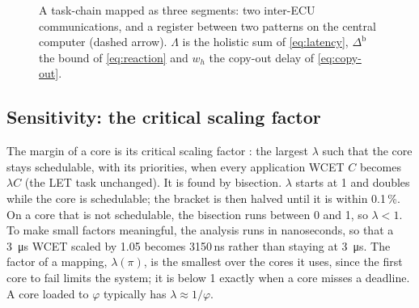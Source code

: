 \begin{figure}[t]
\centering
{}
\caption{A task-chain mapped as three segments: two inter-ECU
communications, and a register between two patterns on the central
computer (dashed arrow). $\Lambda$ is the holistic sum of
\cref{eq:latency}, $\Delta^{\mathrm b}$ the bound of \cref{eq:reaction}
and $w_h$ the copy-out delay of \cref{eq:copy-out}.}
\label{fig:path}
\end{figure}

\subsection{Sensitivity: the critical scaling factor}
\label{sec:sensitivity}

The margin of a core is its critical scaling factor
\cite{lehoczky1989rate,bini2008sensitivity}: the largest $\lambda$ such that
the core stays schedulable, with its priorities, when every application
WCET $C$ becomes $\lambda C$ (the LET task unchanged). It is found by
bisection. $\lambda$ starts at 1 and doubles while the core is schedulable;
the bracket is then halved until it is within 0.1\,\%. On a core that is
not schedulable, the bisection runs between 0 and 1, so $\lambda<1$. To make small
factors meaningful, the analysis runs in nanoseconds, so that a
\SI{3}{\micro s} WCET scaled by 1.05 becomes 3150\,ns rather than staying at
\SI{3}{\micro s}. The factor of a mapping, $\lambda(\pi)$, is the smallest
over the cores it uses, since the first core to fail limits the system; it
is below 1 exactly when a core misses a deadline.
A core loaded to $\varphi$ typically has $\lambda\approx1/\varphi$.

